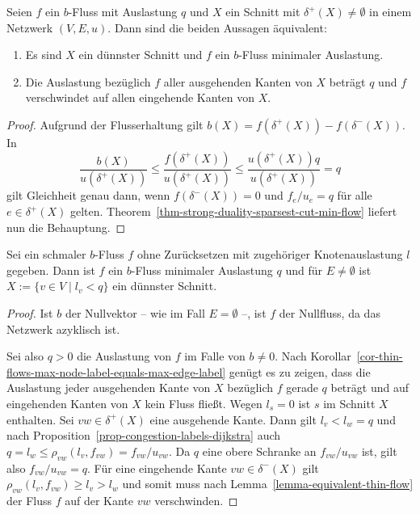 \begin{corollary}\label{prop-easy-characterization-sparsest-cut}
	Seien $f$ ein $b$-Fluss mit Auslastung $q$ und $X$ ein Schnitt mit $\delta^+(X)\neq \emptyset$ in einem Netzwerk $(V, E, u)$.
	Dann sind die beiden Aussagen äquivalent:
	\begin{enumerate}[label=(\roman*)]
		\item Es sind $X$ ein dünnster Schnitt und $f$ ein $b$-Fluss minimaler Auslastung.
		\item Die Auslastung bezüglich $f$ aller ausgehenden Kanten von $X$ beträgt $q$ und $f$ verschwindet auf allen eingehende Kanten von $X$.
	\end{enumerate}
\end{corollary}
\begin{proof}
	Aufgrund der Flusserhaltung gilt $b(X) = f(\delta^+(X)) - f(\delta^-(X))$.
	In \[
	\frac{b(X)}{u(\delta^+(X))} \leq \frac{f(\delta^+(X))}{u(\delta^+(X))} \leq \frac{u(\delta^+(X)) q}{u(\delta^+(X))} = q
	\]
	gilt Gleichheit genau dann, wenn $f(\delta^-(X))=0$ und $f_{e}/u_{e} = q$ für alle $e\in\delta^+(X)$ gelten.
	Theorem~\ref{thm-strong-duality-sparsest-cut-min-flow} liefert nun die Behauptung.
\end{proof}


\begin{lemma}
	Sei ein schmaler $b$-Fluss $f$ ohne Zurücksetzen mit zugehöriger Knotenauslastung $l$ gegeben.
	Dann ist $f$ ein $b$-Fluss minimaler Auslastung $q$ und für $E\neq\emptyset$ ist $X:=\{ v\in V \mid l_v < q \}$ ein dünnster Schnitt.
\end{lemma}
\begin{proof}
	Ist $b$ der Nullvektor -- wie im Fall $E=\emptyset$ --, ist $f$ der Nullfluss, da das Netzwerk azyklisch ist.
	
	Sei also $q>0$ die Auslastung von $f$ im Falle von $b\neq 0$.
	Nach Korollar~\ref{cor-thin-flows-max-node-label-equals-max-edge-label} genügt es zu
	zeigen, dass die Auslastung jeder ausgehenden Kante von $X$ bezüglich $f$ gerade $q$ beträgt und auf eingehenden Kanten von $X$ kein Fluss fließt.
	Wegen $l_s=0$ ist $s$ im Schnitt $X$ enthalten.
	Sei $vw\in\delta^+(X)$ eine ausgehende Kante.
	Dann gilt $l_v < l_w = q $ und nach Proposition~\ref{prop-congestion-labels-dijkstra} auch $q = l_w \leq \rho_{vw}(l_v, f_{vw}) = f_{vw} / u_{vw}$.
	Da $q$ eine obere Schranke an $f_{vw}/u_{vw}$ ist, gilt also $f_{vw}/u_{vw} = q$.
	Für eine eingehende Kante $vw\in\delta^-(X)$ gilt $\rho_{vw}(l_v, f_{vw})\geq l_v > l_w$ und somit muss nach Lemma~\ref{lemma-equivalent-thin-flow} der Fluss $f$ auf der Kante $vw$ verschwinden.
\end{proof}


